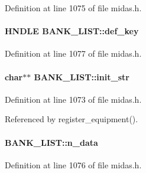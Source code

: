 \begin{DoxyItemize}
\item 
\end{DoxyItemize}

Definition at line 1075 of file midas.h.
\paragraph[{def\_\-key}]{\setlength{\rightskip}{0pt plus 5cm}HNDLE {\bf BANK\_\-LIST::def\_\-key}}\hfill\label{structBANK__LIST_a732747585d79c8c76c856d376aa56cf0}

\begin{DoxyItemize}
\item 
\end{DoxyItemize}

Definition at line 1077 of file midas.h.
\paragraph[{init\_\-str}]{\setlength{\rightskip}{0pt plus 5cm}char$\ast$$\ast$ {\bf BANK\_\-LIST::init\_\-str}}\hfill\label{structBANK__LIST_a7ebd92f00cb428fcbb555f3ad30b86c8}

\begin{DoxyItemize}
\item 
\end{DoxyItemize}

Definition at line 1073 of file midas.h.

Referenced by register\_\-equipment().
\paragraph[{n\_\-data}]{ {\bf BANK\_\-LIST::n\_\-data}}\hfill\label{structBANK__LIST_abea5afb1cbece5741ede80d53469368e}

\begin{DoxyItemize}
\item 
\end{DoxyItemize}

Definition at line 1076 of file midas.h.
